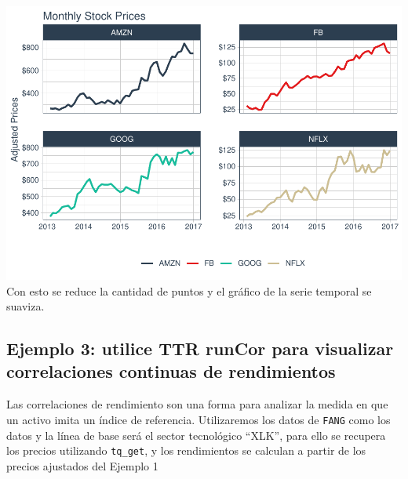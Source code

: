 \documentclass[
]{book}
\begin{document}
\includegraphics{Libro_TidyQualityTools_files/figure-latex/unnamed-chunk-63-1.pdf}
Con esto se reduce la cantidad de puntos y el gráfico de la serie temporal se suaviza.

\hypertarget{ejemplo-3-utilice-ttr-runcor-para-visualizar-correlaciones-continuas-de-rendimientos}{%
\subsection{Ejemplo 3: utilice TTR runCor para visualizar correlaciones continuas de rendimientos}\label{ejemplo-3-utilice-ttr-runcor-para-visualizar-correlaciones-continuas-de-rendimientos}}

Las correlaciones de rendimiento son una forma para analizar la medida en que un activo imita un índice de referencia. Utilizaremos los datos de \texttt{FANG} como los datos y la línea de base será el sector tecnológico ``XLK'', para ello se recupera los precios utilizando \texttt{tq\_get}, y los rendimientos se calculan a partir de los precios ajustados del Ejemplo 1
\end{document}
